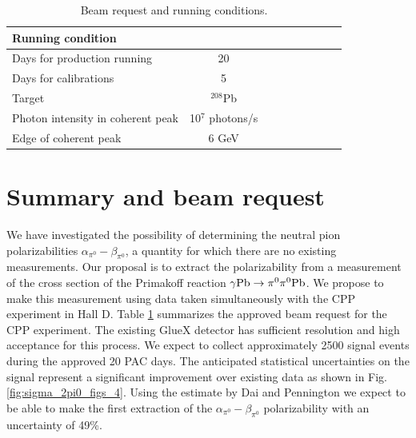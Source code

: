 \begin{table}[bt]
\caption{Beam request and running conditions.
\label{request}
}
\begin{center}
\begin{tabular}{|l|c|c|c|c|c|c|c|c|}
\hline
\hline
  Running condition  &            \\ \hline
  Days for production running  &   20   \\ \hline
  Days for calibrations &  5       \\ \hline
  Target   & $^{208}$Pb   \\ \hline
  Photon intensity in coherent peak &   10$^7$ photons/s     \\ \hline
  Edge of coherent peak  &  6 GeV   \\ \hline
 \hline
 \hline
\end{tabular}
\end{center}
\end{table}
 
\section{Summary and beam request}
We have investigated the possibility of determining the neutral pion
polarizabilities $\alpha_{\pi^0}-\beta_{\pi^0}$, a quantity for which there are no existing measurements.
Our proposal is to extract the polarizability from a 
measurement of the cross section of the Primakoff reaction $\gamma
\rm{Pb}\rightarrow \pi^0 \pi^0 \rm{Pb}$. We propose to make this
measurement using data taken simultaneously with the CPP\cite{CPPexp}
experiment in Hall D. Table \ref{request} summarizes the approved beam request for the CPP experiment.
The existing GlueX detector has sufficient
resolution and high acceptance for this process. We expect to collect approximately 2500 signal events during the
approved 20 PAC days. The anticipated statistical uncertainties on
the signal represent a significant improvement over existing data as shown in Fig.\,\ref{fig:sigma_2pi0_figs_4}.
Using the estimate by Dai and Pennington \cite{Dai:2016ytz} we expect to be able to make the first extraction of the 
$\alpha_{\pi^0}-\beta_{\pi^0}$ polarizability with an uncertainty of 49\%.

